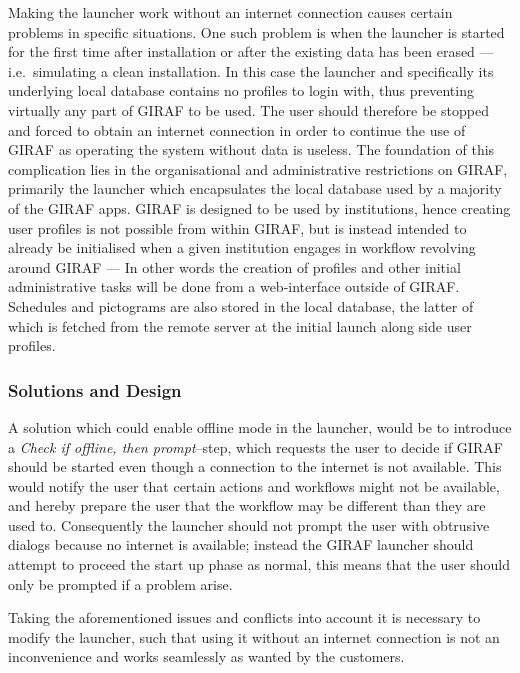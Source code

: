 \bigskip \noindent
Making the launcher work without an internet connection causes certain problems in specific situations.
One such problem is when the launcher is started for the first time after installation or after the existing data has been erased --- i.e.\ simulating a clean installation. 
In this case the launcher and specifically its underlying local database contains no profiles to login with, thus preventing virtually any part of GIRAF to be used. 
The user should therefore be stopped and forced to obtain an internet connection in order to continue the use of GIRAF as operating the system without data is useless. 
The foundation of this complication lies in the organisational and administrative restrictions on GIRAF, primarily the launcher which encapsulates the local database used by a majority of the GIRAF apps.
GIRAF is designed to be used by institutions, hence creating user profiles is not possible from within GIRAF, but is instead intended to already be initialised when a given institution engages in workflow revolving around GIRAF --- In other words the creation of profiles and other initial administrative tasks will be done from a web-interface outside of GIRAF.
Schedules and pictograms are also stored in the local database, the latter of which is fetched from the remote server at the initial launch along side user profiles.

\subsubsection{Solutions and Design}
A solution which could enable offline mode in the launcher, would be to introduce a \textit{Check if offline, then prompt}--step, which requests the user to decide if GIRAF should be started even though a connection to the internet is not available.
This would notify the user that certain actions and workflows might not be available, and hereby prepare the user that the workflow may be different than they are used to.
Consequently the launcher should not prompt the user with obtrusive dialogs because no internet is available; instead the GIRAF launcher should attempt to proceed the start up phase as normal, this means that the user should only be prompted if a problem arise.

\bigskip \noindent
Taking the aforementioned issues and conflicts into account it is necessary to modify the launcher, such that using it without an internet connection is not an inconvenience and works seamlessly as wanted by the customers. 

